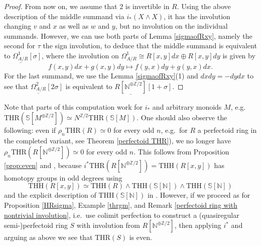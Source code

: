\documentclass[10pt]{amsart}
\theoremstyle{definition}
\numberwithin{equation}{section}
\newcommand{\N}{\mathbb{N}}
\newcommand{\Sphere}{\mathbb{S}}
\newcommand{\Z}{\mathbb{Z}}
\newcommand{\ul}{\underline}
\newcommand{\THH}{\mathrm{THH}}
\newcommand{\THR}{\mathrm{THR}}
\begin{document}
\begin{proof}
From now on, we assume that $2$ is invertible in $R$.
Using the above description of the middle summand via $i_*(X \wedge X)$,
it has the involution changing $v$ and $x$ as well as $w$ and $y$,
but no involution on the individual summands.
However, we can use both parts of Lemma  \ref{sigmaofRxy}, namely the second for $\tau$ the sign involution, to deduce that the middle summand is equivalent to $\ul{\Omega_{A/R}^1}[\sigma]$,
where the involution on $\Omega_{A/R}^1\cong R[x,y]dx \oplus R[x,y]dy$ is given by
\[
f(x,y)dx+g(x,y)dy \mapsto f(y,x)dy+g(y,x)dx.
\]
For the last summand, we use the Lemma \ref{sigmaofRxy}(1) and $dxdy=-dydx$ to see that $\ul{\Omega_{A/R}^2}[2\sigma]$ is equivalent to $\ul{R[\N^{\oplus \Z/2}]}[1+\sigma]$.
\end{proof}

Note that parts of this computation work for $i_*$ and arbitrary monoids $M$,  e.g.\ $\THR(\Sphere[M^{\oplus \Z/2}])\simeq N^{\Z/2}\THR(\Sphere[M])$. One should also observe the following: even if $\rho_n \THR(R)\simeq 0$ for every odd $n$, e.g.\ for $R$ a perfectoid ring in the completed variant, see Theorem \ref{perfectoid THR}), we no longer have $\rho_n \THR(R[\N^{\oplus \Z/2}])\simeq 0$ for every odd $n$.
This follows from Proposition \ref{prop:even} and \cite[Proposition 2.1.3]{HP23}, because  $i^*\THR(R[\N^{\oplus \Z/2}])=\THH(R[x,y])$ has homotopy groups in odd degrees
using
\[
\THH(R[x,y])
\simeq
\THH(R)\wedge \THH(\Sphere[\N])\wedge \THH(\Sphere[\N])
\]
and the explicit description of $\THH(\Sphere[\N])$ in \cite[Proposition 3.20]{Rog09}.
However, if we proceed as for Proposition \ref{HRsigma}, Example \ref{thrgm}, and  Remark \ref{perfectoid ring with nontrivial involution}, i.e.\ use colimit perfection to construct a (quasiregular semi-)perfectoid ring $S$ with involution from $R[\N^{\oplus \Z/2}]$, then applying $i^*$ and arguing as above we see that $\THR(S)$ is even.
\end{document}
